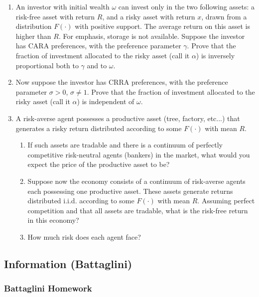 \documentclass[12pt]{article}
\begin{document}
\begin{enumerate}
	\item An investor with initial wealth $\omega$ can invest only in the two following assets: a risk-free asset with return $R$, and a risky asset with return $x$, drawn from a distribution $F(\cdot)$ with positive support. The average return on this asset is higher than $R$. For emphasis, storage is not available. Suppose the investor has CARA preferences, with the preference parameter $\gamma$. Prove that the fraction of investment allocated to the risky asset (call it $\alpha$) is inversely proportional both to $\gamma$ and to $\omega$.
	\item Now suppose the investor has CRRA preferences, with the preference parameter $\sigma > 0$, $\sigma \ne 1$. Prove that the fraction of investment allocated to the risky asset (call it $\alpha$) is independent of $\omega$.
	\item A risk-averse agent possesses a productive asset (tree, factory, etc...) that generates a risky return distributed according to some $F(\cdot)$ with mean $R$.
	\begin{enumerate}
		\item If such assets are tradable and there is a continuum of perfectly competitive risk-neutral agents (bankers) in the market, what would you expect the price of the productive asset to be?
		\item Suppose now the economy consists of a continuum of risk-averse agents each possessing one productive asset. These assets generate returns distributed i.i.d. according to some $F(\cdot)$ with mean $R$. Assuming perfect competition and that all assets are tradable, what is the risk-free return in this economy?
		\item How much risk does each agent face?
	\end{enumerate}
\end{enumerate}

\newpage
\subsection{Information (Battaglini)}

\subsubsection{Battaglini Homework}
\end{document}
